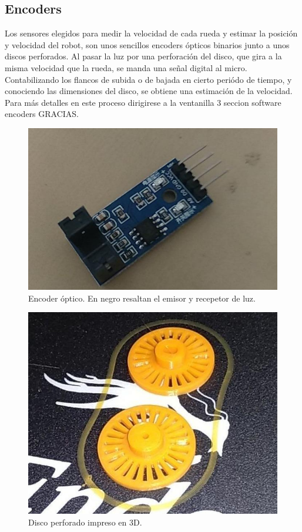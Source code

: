 \subsection{Encoders}
Los sensores elegidos para medir la velocidad de cada rueda y estimar la posición y velocidad del robot, son unos sencillos encoders ópticos binarios junto a unos discos perforados. Al pasar la luz por una perforación del disco, que gira a la misma velocidad que la rueda, se manda una señal digital al micro. Contabilizando los flancos de subida o de bajada en cierto periódo de tiempo, y conociendo las dimensiones del disco, se obtiene una estimación de la velocidad. Para más detalles en este proceso dirigirese a la ventanilla 3 seccion software encoders GRACIAS. 
 \begin{figure}[h!]
 	\centering
 	\includegraphics[width=.6\textwidth]{images/hw/encoder_img}
 	\caption{Encoder óptico. En negro resaltan el emisor y recepetor de luz.}
 \end{figure}
  \begin{figure}[h!]
  	\centering
  	\includegraphics[width=.6\textwidth]{images/hw/encoder_stl}
  	\caption{Disco perforado impreso en 3D.}
  \end{figure}
  
